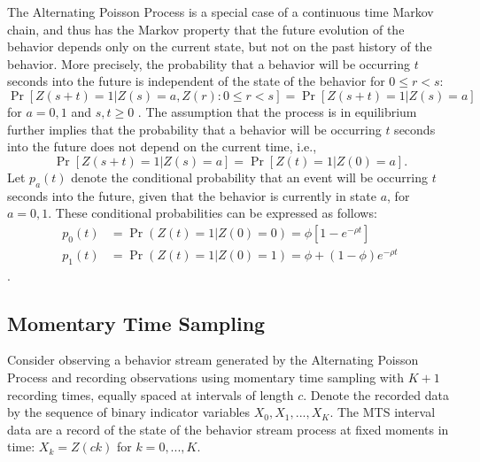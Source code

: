 \documentclass[man, noextraspace, floatsintext]{apa6}\usepackage[]{graphicx}\usepackage[]{color}
\begin{document}
The Alternating Poisson Process is a special case of a continuous time Markov chain, and thus has the Markov property that the future evolution of the behavior depends only on the current state, but not on the past history of the behavior. 
More precisely, the probability that a behavior will be occurring $t$ seconds into the future is independent of the state of the behavior for $0 \leq r < s$: 
\begin{equation}
\label{eq:Markov}
\Pr\left[Z(s + t) = 1 \left| Z(s) = a, Z(r): 0 \leq r < s \right.\right] = \Pr\left[ Z(s + t) = 1 \left| Z(s) = a \right.\right]
\end{equation}
for $a = 0,1$ and $s,t \geq 0$ \citep[Thm. 6.1]{Kulkarni2010modeling}. 
The assumption that the process is in equilibrium further implies that the probability that a behavior will be occurring $t$ seconds into the future does not depend on the current time, i.e.,  
\begin{equation}
\label{eq:equilibrium}
\Pr\left[Z(s + t) = 1 \left| Z(s) = a\right.\right] = \Pr\left[ Z(t) = 1 \left| Z(0) = a \right.\right].
\end{equation}
Let $p_a(t)$ denote the conditional probability that an event will be occurring $t$ seconds into the future, given that the behavior is currently in state $a$, for $a = 0,1$. 
These conditional probabilities can be expressed as follows:
\begin{equation}
\begin{aligned}
p_0(t) &= \Pr(Z(t) = 1 | Z(0) = 0) = \phi \left[1 - e^{-\rho t}\right] \\
p_1(t) &= \Pr(Z(t) = 1 | Z(0) = 1) = \phi + (1 - \phi) e^{-\rho t}
\end{aligned}
\end{equation}
\citep[Eq. 6.17]{Kulkarni2010modeling}.

\subsection{Momentary Time Sampling}
\label{subsec:MTS}

Consider observing a behavior stream generated by the Alternating Poisson Process and recording observations using momentary time sampling with $K + 1$ recording times, equally spaced at intervals of length $c$. 
Denote the recorded data by the sequence of binary indicator variables $X_0,X_1,...,X_K$. The MTS interval data are a record of the state of the behavior stream process at fixed moments in time: $X_k = Z(c k)$ for $k = 0,...,K$. 
\end{document}
